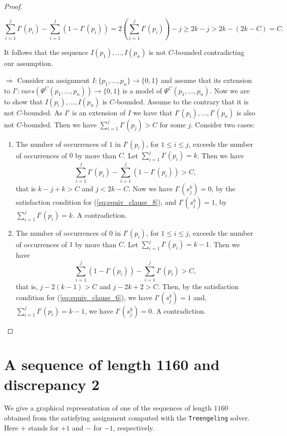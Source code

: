 \documentclass{article} \usepackage[utf8]{inputenc}
\newcommand*{\Treengeling}{\texttt{Treengeling}\xspace}
\begin{document}
\begin{proof}
\begin{enumerate}
$$
\sum_{i=1}^{j}I'(p_{i}) - \sum_{i=1}^{j}(1-I'(p_{i})) = 2( \sum_{i=1}^{j}I'(p_{i})) - j \ge 2k - j > 2k- (2k-C) = C.
$$ 

It follows  that  the sequence $I(p_{1}), \ldots, I(p_{n})$ is not $C$-bounded
contradicting our assumption. 

\end{enumerate}



$\Longrightarrow$ Consider an assignment 
$I : \{p_{1}, \ldots, p_{n}\} \rightarrow \{0,1\}$ and assume that its
extension to $I': vars(\Psi^{C}(p_{1}, \ldots, p_{n})) \rightarrow \{0,1\}$
is a model of  $\Psi^{C}(p_{1}, \ldots, p_{n})$. Now we are to show that
$I(p_{i}), \ldots, I(p_{n})$ is $C$-bounded.  Assume to the contrary that it is
not $C$-bounded. As $I'$ is an extension of $I$ we have that 
$I'(p_{i}), \ldots, I'(p_{n})$ is also not $C$-bounded. 
Then we have $\sum_{i=1}^{j} I'(p_{j}) > C$  for some $j$. Consider two cases: 

\begin{enumerate}
\item The number of occurrences of $1$  in $I'(p_{i})$, for $1 \le i \le j$,
exceeds the number of occurrences of $0$ by more than $C$.  
Let $\sum_{i=1}^{j} I'(p_{i}) = k$. Then we have 
$$
\sum_{i=1}^{j} I'(p_{i}) - \sum_{i=1}^{j}(1 - I'(p_{i})) > C,
$$ that is $ k-j+k > C$ and $j < 2k-C$.  Now we have $I'(s_{j}^{k})=0$, by the satisfaction condition for (\ref{eq:equiv_clause_8}),
and $I'(s_{j}^{k}) = 1$, by  $\sum_{i=1}^{j} I'(p_{i}) = k$. A contradiction.  




\item The number of occurrences of $0$ in $I'(p_{i})$, for  $1 \le i \le j$,
exceeds the number of occurrences of $1$ by more than $C$. 
Let $\sum_{i=1}^{j} I'(p_{i}) = k-1$.  Then we have 
$$
    \sum_{i=1}^{j}(1- I'(p_{i})) - \sum_{i=1}^{j}I'(p_{i}) > C,
$$ 
that is, $j - 2(k-1) > C$ and $j-2k+2 > C$.  
Then, by the satisfaction condition for  (\ref{eq:equiv_clause_6}), we have 
$I'(s_{j}^{k}) = 1$   and, $\sum_{i=1}^{j} I'(p_{i}) = k-1$, we have  $I'(s_{j}^{k}) = 0$.  A contradiction. 
\end{enumerate}
\mbox{}
\end{proof}



 


\section{A sequence of length 1160 and discrepancy 2}\label{sec:sequence}
We give a graphical representation of one of the sequences of length $1160$ 
obtained from the satisfying assignment computed with the \Treengeling solver.
Here $+$ stands for $+1$ and $-$ for $-1$, respectively.
\end{document}
